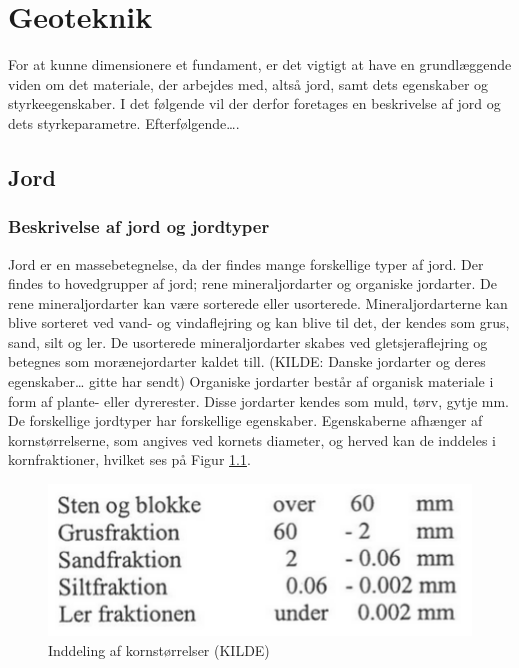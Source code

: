 \chapter{Geoteknik}

For at kunne dimensionere et fundament, er det vigtigt at have en grundlæggende viden om det materiale, der arbejdes med, altså jord, samt dets egenskaber og styrkeegenskaber. I det følgende vil der derfor foretages en beskrivelse af jord og dets styrkeparametre.
\newline \indent{     }  Efterfølgende….

\section{Jord}
\subsection{Beskrivelse af jord og jordtyper}
Jord er en massebetegnelse, da der findes mange forskellige typer af jord. Der findes to hovedgrupper af jord; rene mineraljordarter og organiske jordarter. 
\newline \indent{     }  De rene mineraljordarter kan være sorterede eller usorterede. Mineraljordarterne kan blive sorteret ved vand- og vindaflejring og kan blive til det, der kendes som grus, sand, silt og ler. De usorterede mineraljordarter skabes ved gletsjeraflejring og betegnes som morænejordarter kaldet till. (KILDE: Danske jordarter og deres egenskaber… gitte har sendt)
\newline \indent{     }  Organiske jordarter består af organisk materiale i form af plante- eller dyrerester. Disse jordarter kendes som muld, tørv, gytje mm.
\newline \indent{     }  De forskellige jordtyper har forskellige egenskaber. Egenskaberne afhænger af kornstørrelserne, som angives ved kornets diameter, og herved kan de inddeles i kornfraktioner, hvilket ses på Figur \ref{fig:kornstorrelser}.

\begin{figure}[htbp] \centering
	\begin{minipage}[b]{0.48\textwidth}\centering
		\includegraphics[width=1.0\textwidth]{billeder/kornetsdiameter.png}
		\caption{Inddeling af kornstørrelser (KILDE)}
		\label{fig:kornstorrelser}
	\end{minipage}\hfill
\end{figure}

